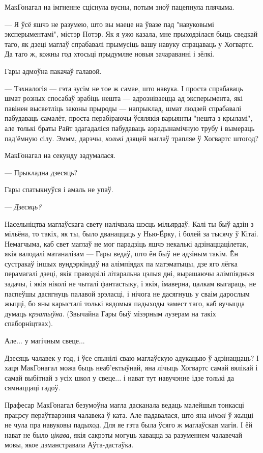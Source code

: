 МакГонагал на імгненне сціснула вусны, потым зноў пацепнула плячыма. 

--- Я ўсё яшчэ не разумею, што вы маеце на ўвазе пад "навуковымі эксперыментамі", 
містэр Потэр. Як я ужо казала, мне прыходзілася быць сведкай таго, як
дзеці маглаў спрабавалі прымусіць вашу навуку спрацаваць у Хогвартс. Да таго ж,
кожны год хтосьці прыдумляе новыя зачараванні і зёлкі.

Гары адмоўна пакачаў галавой. 

--- Тэхналогія --- гэта зусім не тое ж самае, што навука. І проста спрабаваць шмат
розных спосабаў зрабіць нешта --- адрозніваецца ад эксперымента, які павінен 
высветліць законы прыроды --- напрыклад, шмат людзей спрабавалі пабудаваць 
самалёт, проста перабіраючы ўсялякія варыянты "нешта з крыламі", але толькі
браты Райт здагадаліся пабудаваць аэрадынамічную трубу і вымераць пад'ёмную сілу. 
Эммм, дарэчы, \emph{колькі} дзяцей маглаў трапляе ў Хогвартс штогод?

МакГонагал на секунду задумалася.

--- Прыкладна дзесяць?

Гары спатыкнуўся і амаль не упаў.

--- \emph{Дзесяць?}

Насельніцтва маглаўскага свету налічвала шэсць мільярдаў. Калі ты быў адзін з мільёна,
то такіх, як ты, было дванаццаць у Нью-Ёрку, і болей за тысячу ў Кітаі. Немагчыма, каб
свет маглаў не мог парадзіць яшчэ некалькі адзінаццацілетак, якія валодалі матаналізам ---
Гары ведаў, што ён быў не адзіным такім. Ён сустракаў іншых вундэркіндаў на 
 алімпіядах па матэматыцы, дзе яго лёгка перамагалі дзеці, якія праводзілі літаральна
цэлыя дні, вырашаючы алімпіядныя задачы, і якія ніколі не чыталі фантастыку, і якія,
імаверна, цалкам выгараць, не паспеўшы дасягнуць палавой зрэласці, і нічога
не дасягнуць у сваім дарослым жыцці, бо яны карысталі толькі вядомыя падыходы замест
таго, каб вучыцца думаць \emph{крэатыўна}. (Звычайна Гары быў мізэрным лузерам на 
такіх спаборніцтвах).

Але... у магічным свеце...

Дзесяць чалавек у год, і ўсе спынілі сваю маглаўскую адукацыю ў адзінаццаць? І хаця
МакГонагал можа быць неаб'ектыўнай, яна лічыць Хогвартс самай вялікай і самай
выбітнай з усіх школ у свеце... і нават тут навучэнне ідзе толькі да сямнаццаці гадоў.

Прафесар МакГонагал безумоўна магла дасканала ведаць малейшыя тонкасці працэсу
пераўтварэння чалавека ў ката. Але падавалася, што яна \emph{ніколі} ў жыцці не чула
пра навуковы падыход. Для яе гэта была ўсяго ж маглаўская магія. І ёй нават 
не было \emph{цікава}, якія сакрэты могуць хавацца за разуменнем чалавечай мовы, якое
дэманстравала Аўта-дастаўка. 

